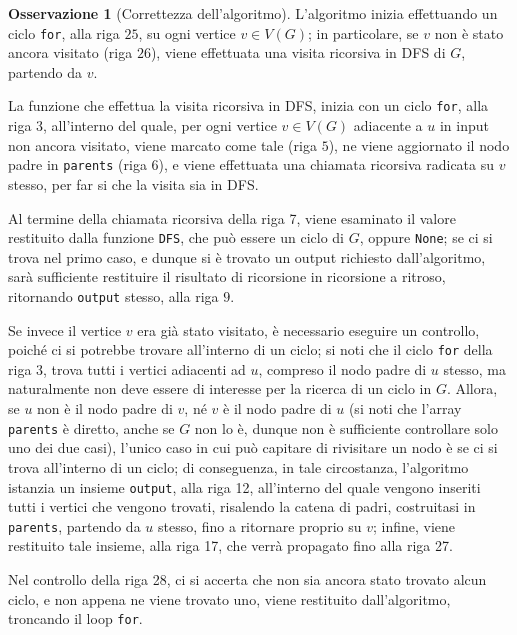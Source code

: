 \documentclass[14pt]{extreport}
\theoremstyle{definition}
\theoremstyle{definition}
\newtheorem{remark}{Osservazione}[subsection]
\begin{document}
\begin{remark}[Correttezza dell'algoritmo]
    L'algoritmo inizia effettuando un ciclo \texttt{for}, alla riga $25$, su ogni vertice $v \in V(G)$; in particolare, se $v$ non è stato ancora visitato (riga $26$), viene effettuata una visita ricorsiva in DFS di $G$, partendo da $v$.

    La funzione che effettua la visita ricorsiva in DFS, inizia con un ciclo \texttt{for}, alla riga $3$, all'interno del quale, per ogni vertice $v \in V(G)$ adiacente a $u$ in input non ancora visitato, viene marcato come tale (riga $5$), ne viene aggiornato il nodo padre in \texttt{parents} (riga $6$), e viene effettuata una chiamata ricorsiva radicata su $v$ stesso, per far si che la visita sia in DFS.

    Al termine della chiamata ricorsiva della riga 7, viene esaminato il valore restituito dalla funzione \texttt{DFS}, che può essere un ciclo di $G$, oppure \texttt{None}; se ci si trova nel primo caso, e dunque si è trovato un output richiesto dall'algoritmo, sarà sufficiente restituire il risultato di ricorsione in ricorsione a ritroso, ritornando \texttt{output} stesso, alla riga $9$.

    Se invece il vertice $v$ era già stato visitato, è necessario eseguire un controllo, poiché ci si potrebbe trovare all'interno di un ciclo; si noti che il ciclo \texttt{for} della riga 3, trova tutti i vertici adiacenti ad $u$, compreso il nodo padre di $u$ stesso, ma naturalmente non deve essere di interesse per la ricerca di un ciclo in $G$. Allora, se $u$ non è il nodo padre di $v$, né $v$ è il nodo padre di $u$ (si noti che l'array \texttt{parents} è diretto, anche se $G$ non lo è, dunque non è sufficiente controllare solo uno dei due casi), l'unico caso in cui può capitare di rivisitare un nodo è se ci si trova all'interno di un ciclo; di conseguenza, in tale circostanza, l'algoritmo istanzia un insieme \texttt{output}, alla riga 12, all'interno del quale vengono inseriti tutti i vertici che vengono trovati, risalendo la catena di padri, costruitasi in \texttt{parents}, partendo da $u$ stesso, fino a ritornare proprio su $v$; infine, viene restituito tale insieme, alla riga 17, che verrà propagato fino alla riga 27.

    Nel controllo della riga 28, ci si accerta che non sia ancora stato trovato alcun ciclo, e non appena ne viene trovato uno, viene restituito dall'algoritmo, troncando il loop \texttt{for}.
\end{remark}
\end{document}
